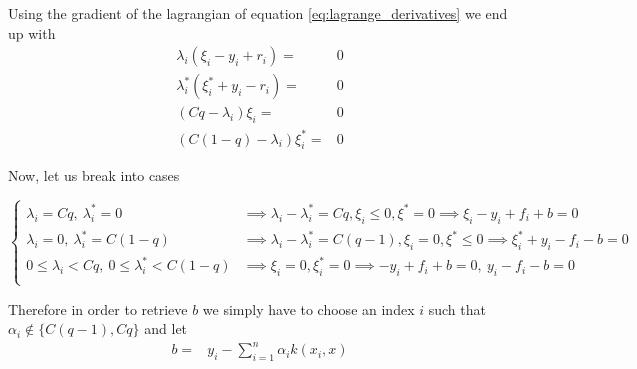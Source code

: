 Using the gradient of the lagrangian of equation \ref{eq:lagrange_derivatives} we end up with
\begin{equation}
    \begin{aligned}
        \lambda_i(\xi_i-y_i+r_i)=&0
        \\
        \lambda_i^*(\xi_i^*+y_i-r_i)=&0
        \\
        (Cq-\lambda_i) \xi_i=&0
        \\
        (C(1-q)-\lambda_i) \xi_i^*=&0
    \end{aligned}
\end{equation}

Now, let us break into cases

\begin{equation}
\begin{cases}
    \lambda_i=Cq, \ \lambda_i^*=0 & \implies \lambda_i-\lambda_i^*=Cq, \xi_i\leq 0, \xi^*=0\implies \xi_i-y_i+f_i+b=0 \\
    \lambda_i=0, \ \lambda_i^*=C(1-q) & \implies \lambda_i-\lambda_i^*=C(q-1), \xi_i= 0, \xi^*\leq 0 \implies \xi_i^*+y_i-f_i-b=0 \\
    0\leq \lambda_i< Cq, \ 0\leq \lambda_i^*< C(1-q) & \implies \xi_i=0,  \xi^*_i= 0 \implies -y_i+f_i+b=0, \ y_i-f_i-b=0 \\
\end{cases}
\end{equation}

Therefore in order to retrieve $b$ we simply have to choose an index $i$ such that  $\alpha_i \not \in \{C(q-1), Cq\}$
and let
\begin{equation}
    \begin{aligned}
    b=&y_i-\sum\limits_{i=1}^n \alpha_i k(x_i,x)
    \end{aligned}
\end{equation}


